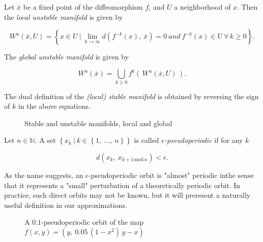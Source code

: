 \begin{definition}
    \cite*{dynbook} Let $\bar{x}$ be a fixed point of the diffeomorphism $f$, and $U$ a neighborhood of $x$. 
    Then the \emph{local unstable manifold} is given by

    \begin{equation}
        W^u(\bar{x}, U) = \left\{x \in U\ \vert\ \lim\limits_{k \rightarrow \infty} 
        d(f^{-k}(x),\ \bar{x}) = 0\ and \ f^{-k}(x) \in U\ \forall\, k \geq 0\right\}.
    \end{equation}

    The \emph{global unstable manifold} is given by

    \begin{equation}
        W^u(\bar{x}) = \bigcup\limits_{k \geq 0} f^k(\,W^u(\bar{x}, U)\,).
    \end{equation}

    The dual definition of the \emph{(local) stable manifold} is obtained by reversing the 
    sign of $k$ in the above equations.
\end{definition}

\begin{figure}[h]
    \caption{\cite*{dynskript} Stable and unstable manifolds, local and global}
    \label{fig:manifold}    
\end{figure}

\begin{definition}[Pseudoperiodic]
    \cite*{dynbook} Let $n\in \mathbb{N}$. A set 
    $\left\{ x_k\ \vert\ k \in \left\{ 1,\ \dotsc ,\ n \right\} \right\}$ 
    is called \emph{$\epsilon$-pseudoperiodic} if for any $k$

    \begin{equation}
        d(x_k,\ x_{k + 1\, \text{mod}\, n}) < \epsilon.
    \end{equation}

\end{definition}

As the name suggests, an $\epsilon$-pseudoperiodic orbit is "almost" periodic inthe sense 
that it represents a "small" perturbation of a theoretically periodic orbit. In practice,
such direct orbits may not be known, but it will preresent a naturally useful definition
in our approximations.

\begin{figure}[h]
    \caption{\cite*{dynbook} A $0.1$-pseudoperiodic orbit of the map $f(x,y) = (y,\ 0.05\, (1 - x^2)\, y - x)$}
    \label{fig:pseudoperiodic}
\end{figure}

